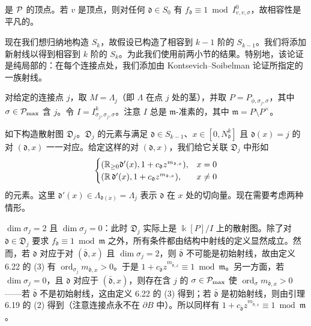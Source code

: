 是 $\mathcal{P}$ 的顶点。若 $v$ 是顶点，则对任何 $\mathfrak{d}\in S_0$ 有 $f_{\mathfrak{d}}\equiv1\bmod I_{v,v,\sigma}^0$，故相容性是平凡的。

现在我们想归纳地构造 $S_k$，故假设已构造了相容到 $k-1$ 阶的 $S_{k-1}$。我们将添加新射线以得到相容到 $k$ 阶的 $S_k$。为此我们使用前两小节的结果。特别地，该论证是纯局部的：在每个连接点处，我们添加由 Kontsevich–Soibelman 论证所指定的一族射线。

对给定的连接点 $j$，取 $M=\Lambda_j$（即 $\Lambda$ 在点 $j$ 处的茎），并取 $P=P_{\phi,\sigma_j,\sigma}$，其中 $\sigma\in\mathcal{P}_{\max}$ 含 $j$。令 $I=I_{\sigma_j,\sigma_j,\sigma}^k$。注意 $I$ 总是 $\mathfrak{m}$-准素的，其中 $\mathfrak{m}=P\setminus P^\times$。

如下构造散射图 $\mathfrak{D}_j$。$\mathfrak{D}_j$ 的元素与满足 $\mathfrak{d}\in S_{k-1}$、$x\in[0,N_{\mathfrak{d}}^k]$ 且 $\mathfrak{d}(x)=j$ 的对 $(\mathfrak{d},x)$ 一一对应。给定这样的对 $(\mathfrak{d},x)$，我们给它关联 $\mathfrak{D}_j$ 中形如
\[
\begin{cases}(\mathbb{R}_{\ge0}\mathfrak{d}'(x),1+c_{\mathfrak{d}}z^{m_{\mathfrak{d},x}}),&x=0\\ (\mathbb{R}\,\mathfrak{d}'(x),1+c_{\mathfrak{d}}z^{m_{\mathfrak{d},x}}),&x\ne0\end{cases}
\]
的元素。这里 $\mathfrak{d}'(x)\in\Lambda_{\mathfrak{d}(x)}=\Lambda_j$ 表示 $\mathfrak{d}$ 在 $x$ 处的切向量。现在需要考虑两种情形。

$\dim\sigma_j=2$ 且 $\dim\sigma_j=0$：此时 $\mathfrak{D}_j$ 实际上是 $\Bbbk[P]/I$ 上的散射图。除了对 $\mathfrak{d}\in\mathfrak{D}_j$ 要求 $f_{\mathfrak{d}}\equiv1\bmod\mathfrak{m}$ 之外，所有条件都由结构中射线的定义显然成立。然而，若 $\mathfrak{d}$ 对应于对 $(\bar{\mathfrak{d}},x)$ 且 $\dim\sigma_j=2$，则 $\bar{\mathfrak{d}}$ 不可能是初始射线，故由定义 6.22 的 (3) 有 $\operatorname{ord}_{\sigma_j}m_{\bar{\mathfrak{d}},x}>0$。于是 $1+c_{\bar{\mathfrak{d}}}z^{m_{\bar{\mathfrak{d}},x}}\equiv1\bmod\mathfrak{m}$。另一方面，若 $\dim\sigma_j=0$，且 $\mathfrak{d}$ 对应于 $(\bar{\mathfrak{d}},x)$，则存在含 $j$ 的 $\sigma\in\mathcal{P}_{\max}$ 使 $\operatorname{ord}_\sigma m_{\bar{\mathfrak{d}},x}>0$——若 $\bar{\mathfrak{d}}$ 不是初始射线，这由定义 6.22 的 (3) 得到；若 $\bar{\mathfrak{d}}$ 是初始射线，则由引理 6.19 的 (2) 得到（注意连接点永不在 $\partial B$ 中）。所以同样有 $1+c_{\bar{\mathfrak{d}}}z^{m_{\bar{\mathfrak{d}},x}}\equiv1\bmod\mathfrak{m}$。

